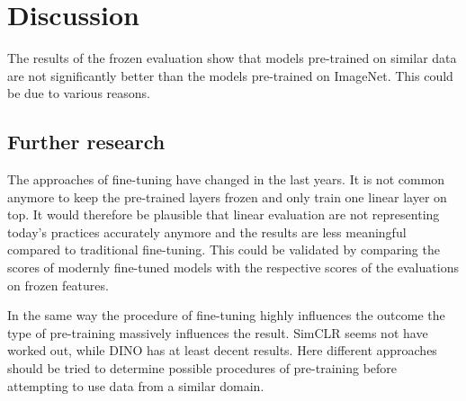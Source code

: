\chapter{Discussion}

The results of the frozen evaluation show that models pre-trained on similar data are not significantly better than the models pre-trained on ImageNet. This could be due to various reasons.

\section{Further research}
The approaches of fine-tuning have changed in the last years. It is not common anymore to keep the pre-trained layers frozen and only train one linear layer on top. 
It would therefore be plausible that linear evaluation are not representing today's practices accurately anymore and the results are less meaningful compared to traditional fine-tuning.
This could be validated by comparing the scores of modernly fine-tuned models with the respective scores of the evaluations on frozen features.

In the same way the procedure of fine-tuning highly influences the outcome the type of pre-training massively influences the result. SimCLR seems not have worked out, while DINO has at least decent results. 
Here different approaches should be tried to determine possible procedures of pre-training before attempting to use data from a similar domain.

















